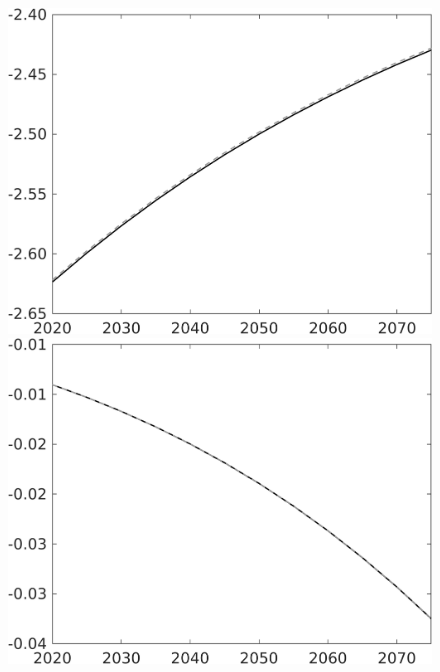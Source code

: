 \begin{figure}[h!!]
\begin{minipage}[]{0.32\textwidth}
	\end{minipage}
\begin{minipage}[]{0.32\textwidth}
\includegraphics[width=1\textwidth]{../../codding_model/own_basedOnFried/optimalPol_010922_revision/figures/all_13Sept22/PerdifNoTauf_regime5_CompTaul_sn_spillover0_nsk0_xgr0_knspil0_sep0_LFlimit0_emsbase0_countec0_GovRev0_etaa0.79_lgd0.png}
\end{minipage}	
\begin{minipage}[]{0.32\textwidth}
	\includegraphics[width=1\textwidth]{../../codding_model/own_basedOnFried/optimalPol_010922_revision/figures/all_13Sept22/PerdifNoTauf_regime5_CompTaul_snS_spillover0_nsk0_xgr0_knspil0_sep0_LFlimit0_emsbase0_countec0_GovRev0_etaa0.79_lgd0.png}

\end{minipage}
\end{figure}
